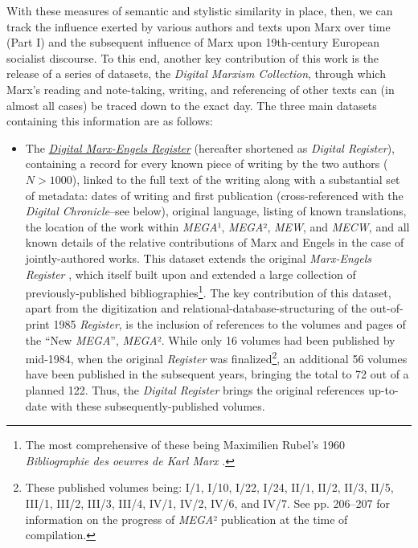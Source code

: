 With these measures of semantic and stylistic similarity in place, then, we can track the influence exerted by various authors and texts upon Marx over time (Part I) and the subsequent influence of Marx upon 19th-century European socialist discourse. To this end, another key contribution of this work is the release of a series of datasets, the \textit{Digital Marxism Collection}, through which Marx's reading and note-taking, writing, and referencing of other texts can (in almost all cases) be traced down to the exact day. The three main datasets containing this information are as follows:

\begin{itemize}
    \item The \href{https://airtable.com/shrFKP7fp64su32Ad}{\textit{Digital Marx-Engels Register}} (hereafter shortened as \textit{Digital Register}), containing a record for every known piece of writing by the two authors ($N > 1000$), linked to the full text of the writing along with a substantial set of metadata: dates of writing and first publication (cross-referenced with the \textit{Digital Chronicle}--see below), original language, listing of known translations, the location of the work within \textit{MEGA}¹, \textit{MEGA}², \textit{MEW}, and \textit{MECW}, and all known details of the relative contributions of Marx and Engels in the case of jointly-authored works. This dataset extends the original \textit{Marx-Engels Register} \citep{draper_marx-engels_1985a}, which itself built upon and extended a large collection of previously-published bibliographies\footnote{The most comprehensive of these being Maximilien Rubel's 1960 \textit{Bibliographie des oeuvres de Karl Marx} \citep{rubel_les_1960}.}. The key contribution of this dataset, apart from the digitization and relational-database-structuring of the out-of-print 1985 \textit{Register}, is the inclusion of references to the volumes and pages of the ``New \textit{MEGA}'', \textit{MEGA}². While only 16 volumes had been published by mid-1984, when the original \textit{Register} was finalized\footnote{These published volumes being: I/1, I/10, I/22, I/24, II/1, II/2, II/3, II/5, III/1, III/2, III/3, III/4, IV/1, IV/2, IV/6, and IV/7. See \cite{draper_marx-engels_1985a} pp. 206--207 for information on the progress of \textit{MEGA}² publication at the time of compilation.}, an additional 56 volumes have been published in the subsequent years, bringing the total to 72 out of a planned 122. Thus, the \textit{Digital Register} brings the original references up-to-date with these subsequently-published volumes.
    

\end{itemize}
